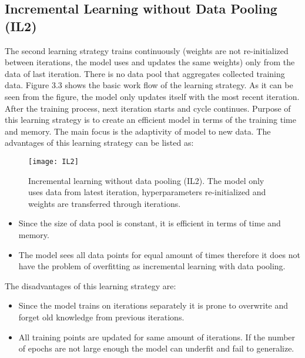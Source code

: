 \subsection{Incremental Learning without Data Pooling (IL2)}

The second learning strategy trains continuously (weights are not re-initialized between iterations, the model uses and updates the same weights) only from the data of last iteration. There is no data pool that aggregates collected training data. Figure 3.3 shows the basic work flow of the learning strategy. As it can be seen from the figure, the model only updates itself with the most recent iteration. After the training process, next iteration starts and cycle continues. Purpose of this learning strategy is to create an efficient model in terms of the training time and memory. The main focus is the adaptivity of model to new data. The advantages of this learning strategy can be listed as:

\begin{figure}[t]
\texttt{[image: IL2]}
\centering
\caption{Incremental learning without data pooling (IL2). The model only uses data from latest iteration, hyperparameters re-initialized and weights are transferred through iterations.}
\end{figure}


\begin{itemize}

\item Since the size of data pool is constant, it is efficient in terms of time and memory.
\item The model sees all data points for equal amount of times therefore it does not have the problem of overfitting as incremental learning with data pooling.

\end{itemize}


The disadvantages of this learning strategy are:

\begin{itemize}

\item Since the model trains on iterations separately it is prone to overwrite and forget old knowledge from previous iterations.
\item All training points are updated for same amount of iterations. If the number of epochs are not large enough the model can underfit and fail to generalize.

\end{itemize}

